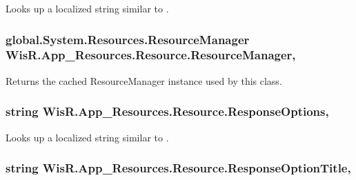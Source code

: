 Looks up a localized string similar to . 

\hypertarget{class_wis_r_1_1_app___resources_1_1_resource_a34966f10f8d78da873c0c70a65fe0462}{}
\subsubsection[{Resource\+Manager}]{\setlength{\rightskip}{0pt plus 5cm}global.\+System.\+Resources.\+Resource\+Manager Wis\+R.\+App\+\_\+\+Resources.\+Resource.\+Resource\+Manager\hspace{0.3cm}{\ttfamily [static]}, {\ttfamily [get]}}\label{class_wis_r_1_1_app___resources_1_1_resource_a34966f10f8d78da873c0c70a65fe0462}


Returns the cached Resource\+Manager instance used by this class. 

\hypertarget{class_wis_r_1_1_app___resources_1_1_resource_a9088f8a911703024cb80747cb5b98858}{}
\subsubsection[{Response\+Options}]{\setlength{\rightskip}{0pt plus 5cm}string Wis\+R.\+App\+\_\+\+Resources.\+Resource.\+Response\+Options\hspace{0.3cm}{\ttfamily [static]}, {\ttfamily [get]}}\label{class_wis_r_1_1_app___resources_1_1_resource_a9088f8a911703024cb80747cb5b98858}


Looks up a localized string similar to . 

\hypertarget{class_wis_r_1_1_app___resources_1_1_resource_a184e04779ae3eef327cc4e1c5abf2266}{}
\subsubsection[{Response\+Option\+Title}]{\setlength{\rightskip}{0pt plus 5cm}string Wis\+R.\+App\+\_\+\+Resources.\+Resource.\+Response\+Option\+Title\hspace{0.3cm}{\ttfamily [static]}, {\ttfamily [get]}}\label{class_wis_r_1_1_app___resources_1_1_resource_a184e04779ae3eef327cc4e1c5abf2266}


